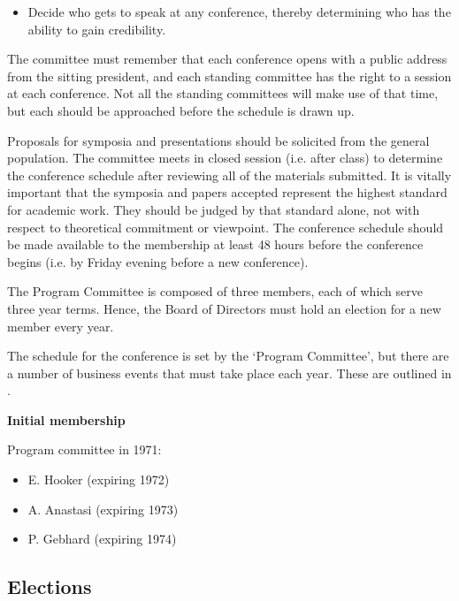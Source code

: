 \begin{refsection}
\begin{itemize}
\item Decide who gets to speak at any conference, thereby determining who has the ability to gain credibility.

\end{itemize}

The committee must remember that each conference opens with a public address from the sitting president, and each standing committee has the right to a session at each conference. Not all the standing committees will make use of that time, but each should be approached before the schedule is drawn up.

Proposals for symposia and presentations should be solicited from the general population. The committee meets in closed session (i.e. after class) to determine the conference schedule after reviewing all of the materials submitted. It is vitally important that the symposia and papers accepted represent the highest standard for academic work. They should be judged by that standard alone, not with respect to theoretical commitment or viewpoint. The conference schedule should be made available to the membership at least 48 hours before the conference begins (i.e. by Friday evening before a new conference).

The Program Committee is composed of three members, each of which serve three year terms. Hence, the Board of Directors must hold an election for a new member every year.

The schedule for the conference is set by the `Program Committee', but there are a number of business events that must take place each year. These are outlined in .

\textbf{Initial membership}

Program committee in 1971:

\begin{itemize}
\item E. Hooker (expiring 1972)

\item A. Anastasi (expiring 1973)

\item P. Gebhard (expiring 1974)

\end{itemize}

\newpage

\subsection{Elections}
\label{elections}


\end{refsection}
